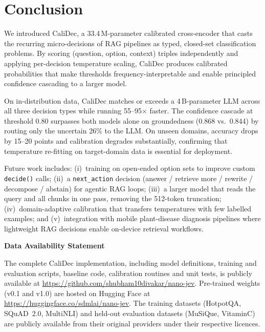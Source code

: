 \documentclass[twocolumn]{ICCKjournal}
\begin{document}
\section{Conclusion}
\label{sec:conclusion}

We introduced CaliDec, a 33.4\,M-parameter calibrated cross-encoder that casts the recurring micro-decisions of RAG pipelines as typed, closed-set classification problems. By scoring (question, option, context) triples independently and applying per-decision temperature scaling, CaliDec produces calibrated probabilities that make thresholds frequency-interpretable and enable principled confidence cascading to a larger model.

On in-distribution data, CaliDec matches or exceeds a 4\,B-parameter LLM across all three decision types while running 55--95$\times$ faster. The confidence cascade at threshold 0.80 surpasses both models alone on groundedness (0.868 vs.\ 0.844) by routing only the uncertain 26\% to the LLM. On unseen domains, accuracy drops by 15--20 points and calibration degrades substantially, confirming that temperature re-fitting on target-domain data is essential for deployment.

Future work includes: (i)~training on open-ended option sets to improve custom \texttt{decide()} calls; (ii)~a \texttt{next\_action} decision (answer / retrieve more / rewrite / decompose / abstain) for agentic RAG loops; (iii)~a larger model that reads the query and all chunks in one pass, removing the 512-token truncation; (iv)~domain-adaptive calibration that transfers temperatures with few labelled examples; and (v)~integration with mobile plant-disease diagnosis pipelines where lightweight RAG decisions enable on-device retrieval workflows.


\par
\vspace{10pt}
{\large\textbf{Data Availability Statement}}

The complete CaliDec implementation, including model definitions, training and evaluation scripts, baseline code, calibration routines and unit tests, is publicly available at \url{https://github.com/shubham10divakar/nano-jev}. Pre-trained weights (v0.1 and v1.0) are hosted on Hugging Face at \url{https://huggingface.co/sdmlai/nano-jev}. The training datasets (HotpotQA, SQuAD~2.0, MultiNLI) and held-out evaluation datasets (MuSiQue, VitaminC) are publicly available from their original providers under their respective licences.
\end{document}
